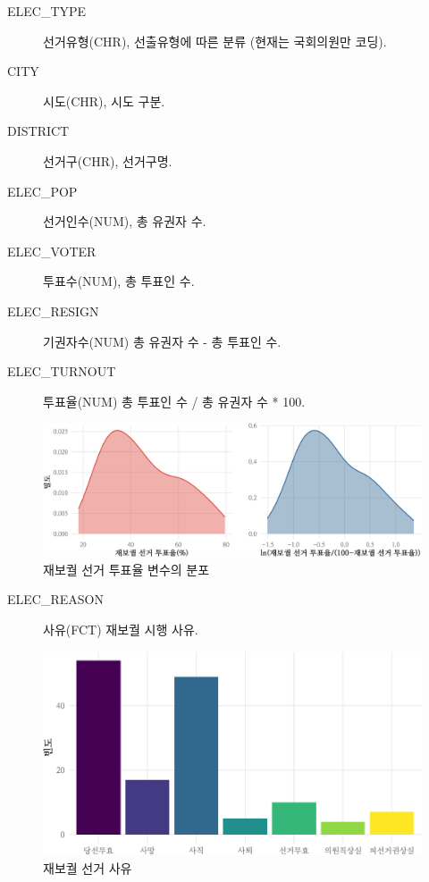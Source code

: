 \documentclass[
  11pt,
  letter]{article}
\begin{document}
\begin{description}
\item[ELEC\_TYPE]
선거유형(CHR), 선출유형에 따른 분류 (현재는 국회의원만 코딩).
\item[CITY]
시도(CHR), 시도 구분.
\item[DISTRICT]
선거구(CHR), 선거구명.
\item[ELEC\_POP]
선거인수(NUM), 총 유권자 수.
\item[ELEC\_VOTER]
투표수(NUM), 총 투표인 수.
\item[ELEC\_RESIGN]
기권자수(NUM) 총 유권자 수 - 총 투표인 수.
\item[ELEC\_TURNOUT]
투표율(NUM) 총 투표인 수 / 총 유권자 수 * 100.
\end{description}

\begin{figure}
\centering
\includegraphics{Codebook_national_files/figure-latex/unnamed-chunk-2-1.pdf}
\caption{재보궐 선거 투표율 변수의 분포}
\end{figure}

\begin{description}
\item[ELEC\_REASON]
사유(FCT) 재보궐 시행 사유.
\end{description}

\begin{figure}
\centering
\includegraphics{Codebook_national_files/figure-latex/unnamed-chunk-3-1.pdf}
\caption{재보궐 선거 사유}
\end{figure}
\end{document}
